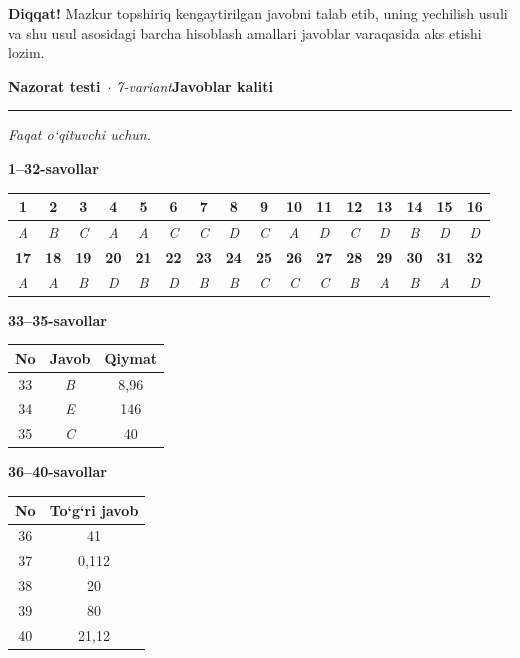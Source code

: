 \documentclass[11pt,a4paper]{article}
\newcommand{\qsep}{\par\vspace{1pt}\noindent\rule{0pt}{0.4pt}\par\vspace{5pt}}
\newcommand{\diqqat}[1]{\par\smallskip\noindent\textbf{Diqqat!} #1\par\medskip}
\begin{document}
\diqqat{Mazkur topshiriq kengaytirilgan javobni talab etib, uning yechilish usuli va shu usul asosidagi barcha hisoblash amallari javoblar varaqasida aks etishi lozim.}\qsep
\newpage
\noindent\textbf{\fontsize{13}{15}\selectfont Nazorat testi}\ \textit{$\cdot$ 7-variant}\hfill \textbf{Javoblar kaliti}\par\smallskip\hrule\smallskip
\textit{Faqat o`qituvchi uchun.}\par\medskip
\noindent\textbf{1--32-savollar}\par\smallskip
\noindent\begin{tabular}{|c|c|c|c|c|c|c|c|c|c|c|c|c|c|c|c|}\hline
\textbf{1} & \textbf{2} & \textbf{3} & \textbf{4} & \textbf{5} & \textbf{6} & \textbf{7} & \textbf{8} & \textbf{9} & \textbf{10} & \textbf{11} & \textbf{12} & \textbf{13} & \textbf{14} & \textbf{15} & \textbf{16}\\\hline
\textsl{A} & \textsl{B} & \textsl{C} & \textsl{A} & \textsl{A} & \textsl{C} & \textsl{C} & \textsl{D} & \textsl{C} & \textsl{A} & \textsl{D} & \textsl{C} & \textsl{D} & \textsl{B} & \textsl{D} & \textsl{D}\\\hline
\textbf{17} & \textbf{18} & \textbf{19} & \textbf{20} & \textbf{21} & \textbf{22} & \textbf{23} & \textbf{24} & \textbf{25} & \textbf{26} & \textbf{27} & \textbf{28} & \textbf{29} & \textbf{30} & \textbf{31} & \textbf{32}\\\hline
\textsl{A} & \textsl{A} & \textsl{B} & \textsl{D} & \textsl{B} & \textsl{D} & \textsl{B} & \textsl{B} & \textsl{C} & \textsl{C} & \textsl{C} & \textsl{B} & \textsl{A} & \textsl{B} & \textsl{A} & \textsl{D}\\\hline
\end{tabular}\par\medskip
\noindent\textbf{33--35-savollar}\par\smallskip
\noindent\begin{tabular}{|c|c|c|}\hline \textbf{No} & \textbf{Javob} & \textbf{Qiymat}\\\hline
33 & \textsl{B} & 8,96\\\hline
34 & \textsl{E} & 146\\\hline
35 & \textsl{C} & 40\\\hline
\end{tabular}\par\medskip
\noindent\textbf{36--40-savollar}\par\smallskip
\noindent\begin{tabular}{|c|c|}\hline \textbf{No} & \textbf{To`g`ri javob}\\\hline
36 & 41\\\hline
37 & 0,112\\\hline
38 & 20\\\hline
39 & 80\\\hline
40 & 21,12\\\hline
\end{tabular}\par\medskip
\end{document}
